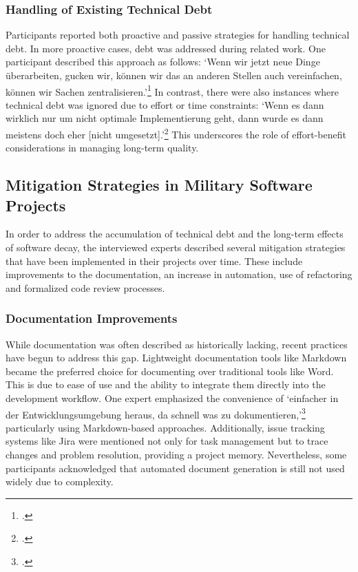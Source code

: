 \subsubsection{Handling of Existing Technical Debt}
Participants reported both proactive and passive strategies for handling technical debt. In more proactive cases, debt was addressed during related work. One participant described this approach as follows: `Wenn wir jetzt neue Dinge überarbeiten, gucken wir, können wir das an anderen Stellen auch vereinfachen, können wir Sachen zentralisieren.'\footcite{Interview32025}
In contrast, there were also instances where technical debt was ignored due to effort or time constraints: `Wenn es dann wirklich nur um nicht optimale Implementierung geht, dann wurde es dann meistens doch eher [nicht umgesetzt].'\footcite{Interview22025}
This underscores the role of effort-benefit considerations in managing long-term quality.\\

\subsection{Mitigation Strategies in Military Software Projects}
In order to address the accumulation of technical debt and the long-term effects of software decay, the interviewed experts described several mitigation strategies that have been implemented in their projects over time. These include improvements to the documentation, an increase in automation,
use of refactoring and formalized code review processes.

\subsubsection{Documentation Improvements}
While documentation was often described as historically lacking, recent practices have begun to address this gap. Lightweight documentation tools like Markdown became the preferred choice for documenting over traditional tools like Word. This is due to ease of use and the ability to integrate 
them directly into the development workflow. One expert emphasized the convenience of `einfacher in der Entwicklungsumgebung heraus, da schnell was zu dokumentieren,'\footcite{Interview32025} particularly using Markdown-based approaches. Additionally, issue tracking systems like Jira were mentioned not only for task management
but to trace changes and problem resolution, providing a project memory. Nevertheless, some participants acknowledged that automated document generation is still not used widely due to complexity.\\

